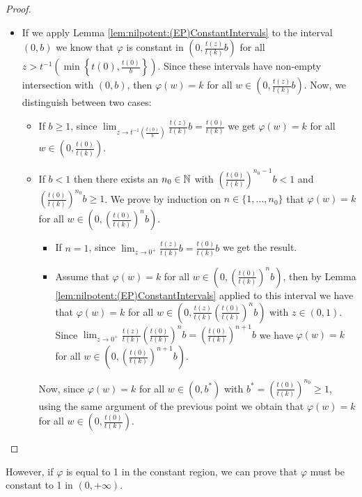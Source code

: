 \begin{proof}
\begin{itemize}
		\item If we apply Lemma \ref{lem:nilpotent:(EP)ConstantIntervals} to the interval $(0,b)$ we know that $\varphi$ is constant in $\left(0,\frac{t(z)}{t(k)}b\right)$ for all $z>t^{-1}\left(\min \left \{ t(0),\frac{t(0)}{b}\right\}\right)$. Since these intervals have non-empty intersection with $(0,b)$, then $\varphi(w)=k$ for all $w \in \left(0,\frac{t(z)}{t(k)}b\right)$. Now, we distinguish between two cases:
		\begin{itemize}
			\item If $b \geq 1$, since $\displaystyle \lim_{z \to t^{-1} \left(\frac{t(0)}{b}\right)} \frac{t(z)}{t(k)}b = \frac{t(0)}{t(k)}$ we get $\varphi(w)=k$ for all $w \in \left(0,\frac{t(0)}{t(k)}\right)$.
			\item If $b < 1$ then there exists an $n_0 \in \mathbb{N}$ with $\left(\frac{t(0)}{t(k)}\right)^{n_0-1}b<1$ and $\left(\frac{t(0)}{t(k)}\right)^{n_0}b\geq 1$. We prove by induction on $n \in \{1,\dots,n_0\}$ that $\varphi(w)=k$ for all $w \in \left(0,\left(\frac{t(0)}{t(k)}\right)^{n}b\right)$.
			\begin{itemize}
				\item If $n=1$, since $\displaystyle \lim_{z \to 0^+} \frac{t(z)}{t(k)}b=\frac{t(0)}{t(k)}b$ we get the result.
				\item Assume that $\varphi(w)=k$ for all $w \in \left(0,\left(\frac{t(0)}{t(k)}\right)^nb\right)$, then by Lemma \ref{lem:nilpotent:(EP)ConstantIntervals} applied to this interval we have that $\varphi(w)=k$ for all $w \in \left(0,\frac{t(z)}{t(k)}\left(\frac{t(0)}{t(k)}\right)^nb\right)$ with $z \in (0,1)$. Since $\displaystyle \lim_{z \to 0^+} \frac{t(z)}{t(k)}\left(\frac{t(0)}{t(k)}\right)^nb = \left(\frac{t(0)}{t(k)}\right)^{n+1}b$ we have $\varphi(w)=k$ for all $w \in \left(0,\left(\frac{t(0)}{t(k)}\right)^{n+1}b\right)$.
			\end{itemize}
			Now, since $\varphi(w)=k$ for all $w \in (0,b^*)$ with $b^* = \left(\frac{t(0)}{t(k)}\right)^{n_0} \geq 1$, using the same argument of the previous point we obtain that $\varphi(w)=k$ for all $w \in \left(0,\frac{t(0)}{t(k)}\right)$.
		\end{itemize}
	\end{itemize}
\end{proof}

However, if $\varphi$ is equal to 1 in the constant region, we can prove that $\varphi$ must be constant to 1 in $(0,+\infty)$.

